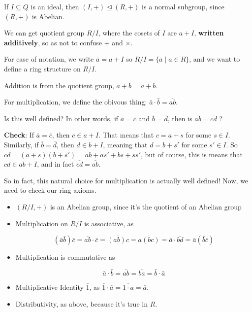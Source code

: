 \documentclass[12pt]{article}
\begin{document}
If $I \subseteq Q$ is an ideal, then $(I, +) \trianglelefteq (R, +)$ is a normal
subgroup, since $(R, +)$ is Abelian.

We can get quotient group $R / I$, where the cosets of $I$ are $a + I$, {\bf written
additively}, so as not to confuse $+$ and $\times$.

For ease of notation, we write $\bar a = a + I$ so $R / I = \{\bar a \mid a \in
R\}$, and we want to define a ring structure on $R / I$.

Addition is from the quotient group, $\bar a + \bar b = \overline{a + b}$.

For multiplication, we define the obivous thing: $\bar a \cdot \bar b =
\overline{ab}$. 

Is this well defined? In other words, if $\bar a = \bar c$ and $\bar b = \bar
d$, then is $\overline{ab} = \overline{cd}$ ?

{\bf Check}: If $\bar a = \bar c$, then $c \in a + I$. That means that $c = a +
s$ for some $s \in I$. Similarly, if $\bar b = \bar d$, then $d \in b + I$,
meaning that $d = b + s'$ for some $s' \in I$. So $cd = (a + s)(b + s') = ab +
as' + bs + ss'$, but of course, this is means that $cd \in ab + I$, and in fact
$\overline{cd} = \overline{ab}$.

So in fact, this natural choice for multiplication is actually well defined!
Now, we need to check our ring axioms.

\begin{itemize}
  \item $(R / I, +)$ is an Abelian group, since it's the quotient of an Abelian
    group
  \item Multiplication on $R / I$ is associative, as

    \[
      (\bar a \bar b) \bar c = \overline{ab} \cdot \bar c = \overline{(ab)c} = \overline{a(bc)} = \bar a \cdot \overline{bd} = \bar a (\bar b \bar c)
    \]

  \item Multiplication is commutative as

    \[
      \bar a \cdot \bar b = \overline{ab} = \overline{ba} = \bar b \cdot \bar a
    \]

  \item Multiplicative Identity $\bar 1$, as $\bar 1 \cdot \bar a = \overline{1
    \cdot a} = \bar a$.

  \item Distributivity, as above, because it's true in $R$.
\end{itemize}
\end{document}
